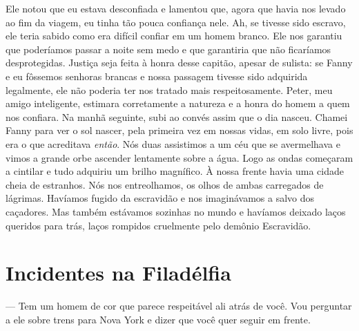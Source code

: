 Ele notou que eu estava desconfiada e
lamentou que, agora que havia nos levado ao fim da viagem, eu tinha tão
pouca confiança nele. Ah, se tivesse sido escravo, ele teria sabido como
era difícil confiar em um homem branco. Ele nos garantiu que poderíamos
passar a noite sem medo e que garantiria que não ficaríamos
desprotegidas. Justiça seja feita à honra desse capitão, apesar de
sulista: se Fanny e eu fôssemos senhoras brancas e nossa passagem
tivesse sido adquirida legalmente, ele não poderia ter nos tratado mais
respeitosamente. Peter, meu amigo inteligente, estimara corretamente a
natureza e a honra do homem a quem nos confiara. Na manhã seguinte, subi
ao convés assim que o dia nasceu. Chamei Fanny para ver o sol nascer,
pela primeira vez em nossas vidas, em solo livre, pois era o que
acreditava \emph{então}. Nós duas assistimos a um céu que se avermelhava
e vimos a grande orbe ascender lentamente sobre a água. Logo as ondas
começaram a cintilar e tudo adquiriu um brilho magnífico. À nossa frente
havia uma cidade cheia de estranhos. Nós nos entreolhamos, os olhos de
ambas carregados de lágrimas. Havíamos fugido da escravidão e nos
imaginávamos a salvo dos caçadores. Mas também estávamos sozinhas no
mundo e havíamos deixado laços queridos para trás, laços rompidos
cruelmente pelo demônio Escravidão.

\chapter*{Incidentes na Filadélfia}


--- Tem um homem de cor que parece respeitável ali atrás de você. Vou
perguntar a ele sobre trens para Nova York e dizer que você quer seguir
em frente.

